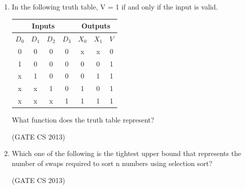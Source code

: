 \documentclass[a4paper, 11pt]{article}
\begin{document}
\begin{enumerate}
    \item In the following truth table, V = 1 if and only if the input is valid. \\
    \begin{table}[H]
    \centering
    \begin{tabular}{|c|c|c|c||c|c|c|}
    \hline
    \multicolumn{4}{|c||}{\textbf{Inputs}} & \multicolumn{3}{c|}{\textbf{Outputs}} \\ \hline
    $D_0$ & $D_1$ & $D_2$ & $D_3$ & $X_0$ & $X_1$ & $V$ \\ \hline
    0 & 0 & 0 & 0 & x & x & 0 \\ \hline
    1 & 0 & 0 & 0 & 0 & 0 & 1 \\ \hline
    x & 1 & 0 & 0 & 0 & 1 & 1 \\ \hline
    x & x & 1 & 0 & 1 & 0 & 1 \\ \hline
    x & x & x & 1 & 1 & 1 & 1 \\ \hline
    \end{tabular}
    \end{table}
    What function does the truth table represent? 
    \begin{enumerate}
    \end{enumerate}
    
    \hfill (GATE CS 2013)
    
    \item Which one of the following is the tightest upper bound that represents the number of swaps required to sort n numbers using selection sort?  
    \begin{enumerate}
    \end{enumerate}
    
    \hfill (GATE CS 2013)
    

\end{enumerate}
\end{document}
